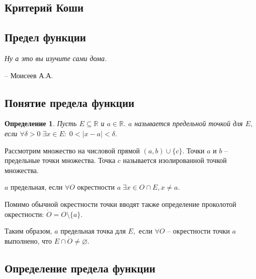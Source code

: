 \documentclass{article}
\newtheorem{Definition}{Определение}[section]
\begin{document}
\subsection{Критерий Коши}
\newpage

\begin{center}
\section{\LARGE{\bf Предел функции}}
\end{center}
\epigraph{\textit{Ну а это вы изучите сами дома.}}
{-- Моисеев А.А.}
\subsection{Понятие предела функции}
\begin{Definition}
Пусть $E\subseteq\mathbb{R}$ и $a\in\mathbb{R}.$ $a$ называется предельной точкой для $E,$ если $\forall\delta>0\;\exists x\in E: \; 0<\mid x-a\mid<\delta.$
\end{Definition}

Рассмотрим множество на числовой прямой $(a, b)\cup\{c\}.$ Точки $a$ и $b$ -- предельные точки множества. Точка $c$ называется изолированной точкой множества.


$a$ предельная, если $\forall O$ окрестности $a \; \exists x\in O\cap E, x\neq a.$

Помимо обычной окрестности точки вводят также определение проколотой окрестности: $\dot{O} = O\setminus\{a\}.$

Таким образом, $a$ предельная точка для $E,$ если $\forall O$ -- окрестности точки $a$ выполнено, что $E\cap\dot{O}\neq\varnothing.$

\subsection{Определение предела функции}
\end{document}
